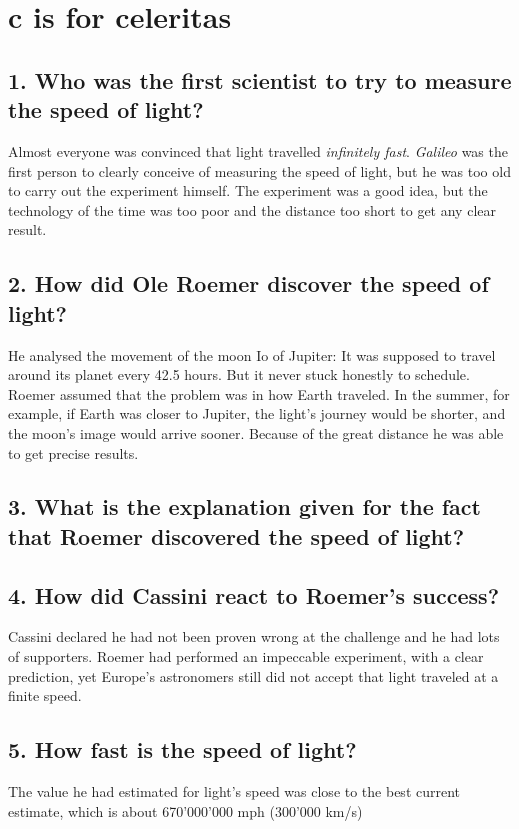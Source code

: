 %
\newpage
\section{c is for celeritas}

\subsection*{1. Who was the first scientist to try to measure the speed of light?}
Almost everyone was convinced that light travelled \emph{infinitely fast}. \emph{Galileo} was the first person to clearly conceive of measuring the speed of light, but he was too old to carry out the experiment himself. The experiment was a good idea, but the technology of the time was too poor and the distance too short to get any clear result.

\subsection*{2. How did Ole Roemer discover the speed of light?}
He analysed the movement of the moon Io of Jupiter: It was supposed to travel around its planet every 42.5 hours. But it never stuck honestly to schedule. Roemer assumed that the problem was in how Earth traveled. In the summer, for example, if Earth was closer to Jupiter, the light's journey would be shorter, and the moon's image would arrive sooner. Because of the great distance he was able to get precise results.

\subsection*{3. What is the explanation given for the fact that Roemer discovered the speed of light?}

\subsection*{4. How did Cassini react to Roemer's success?}
Cassini declared he had not been proven wrong at the challenge and he had lots of supporters. Roemer had performed an impeccable experiment, with a clear prediction, yet Europe's astronomers still did not accept that light traveled at a finite speed.

\subsection*{5. How fast is the speed of light?}
The value he had estimated for light's speed was close to the best current estimate, which is about 670'000'000 mph (300'000 km/s)

